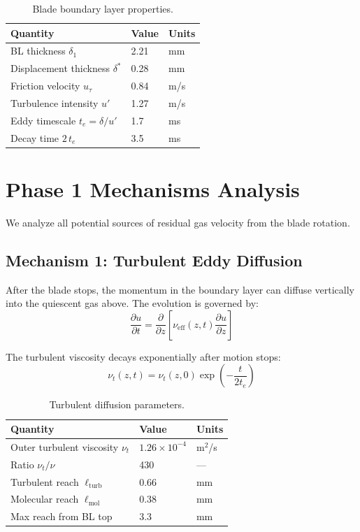 \documentclass[11pt,a4paper]{article}
\begin{document}
\begin{table}[H]
\centering
\caption{Blade boundary layer properties.}
\label{tab:BL}
\begin{tabular}{lll}
\toprule
Quantity & Value & Units \\
\midrule
BL thickness $\delta_1$ & 2.21 & mm \\
Displacement thickness $\delta^*$ & 0.28 & mm \\
Friction velocity $u_\tau$ & 0.84 & m/s \\
Turbulence intensity $u'$ & 1.27 & m/s \\
Eddy timescale $t_e = \delta/u'$ & 1.7 & ms \\
Decay time $2\,t_e$ & 3.5 & ms \\
\bottomrule
\end{tabular}
\end{table}


\section{Phase 1 Mechanisms Analysis}
\label{sec:mechanisms}

We analyze all potential sources of residual gas velocity from the blade rotation.

\subsection{Mechanism 1: Turbulent Eddy Diffusion}

After the blade stops, the momentum in the boundary layer can diffuse
vertically into the quiescent gas above. The evolution is governed by:
\begin{equation}
  \frac{\partial u}{\partial t} = \frac{\partial}{\partial z}
    \left[\nu_\mathrm{eff}(z,t)\frac{\partial u}{\partial z}\right]
\end{equation}

The turbulent viscosity decays exponentially after motion stops:
\begin{equation}
  \nu_t(z,t) = \nu_t(z,0)\exp\left(-\frac{t}{2t_e}\right)
\end{equation}

\begin{table}[H]
\centering
\caption{Turbulent diffusion parameters.}
\label{tab:diffusion}
\begin{tabular}{lll}
\toprule
Quantity & Value & Units \\
\midrule
Outer turbulent viscosity $\nu_t$ & $1.26 \times 10^{-4}$ & m$^2$/s \\
Ratio $\nu_t/\nu$ & 430 & --- \\
Turbulent reach $\ell_\mathrm{turb}$ & 0.66 & mm \\
Molecular reach $\ell_\mathrm{mol}$ & 0.38 & mm \\
Max reach from BL top & 3.3 & mm \\
\bottomrule
\end{tabular}
\end{table}
\end{document}
